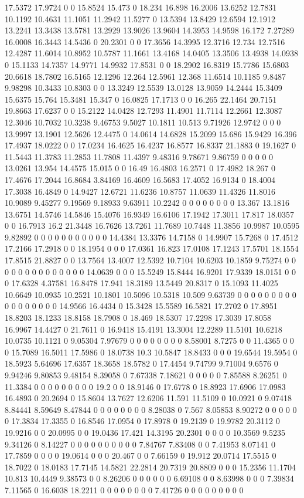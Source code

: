 17.5372 17.9724 0 0 15.8524 15.473 0 18.234 16.898 16.2006 13.6252 12.7831 10.1192 10.4631 11.1051 11.2942 11.5277 0 13.5394 13.8429 12.6594 12.1912 13.2241 13.3438 13.5781 13.2929 13.9026 13.9604 14.3953 14.9598 16.172 7.27289 16.0008 16.3443 14.5436 0 20.2301 0 0 17.3656 14.3995 12.3716 12.734 12.7516 12.4287 11.6014 10.8952 10.5787 11.1661 13.4168 14.0405 13.3506 13.4938 14.0938 0 15.1133 14.7357 14.9771 14.9932 17.8531 0 0 18.2902 16.8319 15.7786 15.6803 20.6618 18.7802 16.5165 12.1296 12.264 12.5961 12.368 11.6514 10.1185 9.8487 9.98298 10.3433 10.8303 0 0 13.3249 12.5539 13.0128 13.9059 14.2444 15.3409 15.6375 15.764 15.3481 15.347 0 16.0825 17.1713 0 0 16.265 22.1464 20.7151 19.8663 17.6237 0 0 15.2122 14.0428 12.7293 11.4901 11.7114 12.2661 12.3087 12.3046 10.7032 10.3238 9.46753 9.5027 10.1811 10.513 9.71926 12.9742 0 0 0 13.9997 13.1901 12.5626 12.4475 0 14.0614 14.6828 15.2099 15.686 15.9429 16.396 17.4937 18.0222 0 0 17.0234 16.4625 16.4237 16.8577 16.8337 21.1883 0 19.1627 0 11.5443 11.3783 11.2853 11.7808 11.4397 9.48316 9.78671 9.86759 0 0 0 0 0 13.0261 13.954 14.4575 15.015 0 0 16.49 16.4803 16.2571 0 17.4982 18.267 0 17.4676 17.2044 16.8684 3.84169 16.4609 16.5683 17.4052 16.9134 0 18.4004 17.3038 16.4849 0 14.9427 12.6721 11.6236 10.8757 11.0639 11.4326 11.8016 10.9089 9.45277 9.19569 9.18933 9.63911 10.2242 0 0 0 0 0 0 0 0 13.367 13.1816 13.6751 14.5746 14.5846 15.4076 16.9349 16.6106 17.1942 17.3011 17.817 18.0357 0 0 16.7913 16.2 21.3448 16.7626 13.7261 11.7689 10.7448 11.3856 10.9987 10.0595 9.82892 0 0 0 0 0 0 0 0 0 0 0 14.4384 13.3376 14.7158 0 14.9907 15.7268 0 17.4512 17.2166 17.2918 0 0 18.1954 0 0 0 17.0361 16.823 17.0108 17.1243 17.5701 18.1554 17.8515 21.8827 0 0 13.7564 13.4007 12.5392 10.7104 10.6203 10.1859 9.75274 0 0 0 0 0 0 0 0 0 0 0 0 0 0 14.0639 0 0 0 15.5249 15.8444 16.9201 17.9339 18.0151 0 0 0 17.6328 4.37581 16.8478 17.941 18.3189 13.5449 20.8317 0 15.1093 11.4025 10.6649 10.0935 10.2521 10.1801 10.5096 10.5318 10.509 9.63739 0 0 0 0 0 0 0 0 0 0 0 0 0 0 0 0 0 14.9566 16.4434 0 15.3428 15.5589 16.5821 17.2702 0 17.8951 18.8203 18.1233 18.8158 18.7908 0 18.469 18.5307 17.2298 17.3039 17.8058 16.9967 14.4427 0 21.7611 0 16.9418 15.4191 13.3004 12.2289 11.5101 10.6218 10.0735 10.1121 0 9.05304 7.97679 0 0 0 0 0 0 0 0 8.58001 8.7275 0 0 11.4365 0 0 0 15.7089 16.5011 17.5986 0 18.0738 10.3 10.5847 18.8433 0 0 0 19.6544 19.5954 0 18.5923 5.64696 17.6357 18.3658 18.5782 0 17.4454 9.74799 9.71004 9.6576 0 9.94246 9.80853 9.48154 8.39058 0 7.67338 7.18621 0 0 0 0 0 7.85588 8.26251 0 11.3384 0 0 0 0 0 0 0 0 0 19.2 0 0 18.9146 0 17.6778 0 18.8923 17.6906 17.0983 16.4893 0 20.2694 0 15.8604 13.7627 12.6206 11.591 11.5109 0 10.0921 0 9.07418 8.84441 8.59649 8.47844 0 0 0 0 0 0 0 0 8.28038 0 7.567 8.05853 8.90272 0 0 0 0 0 0 17.3834 17.3355 0 16.8546 17.0954 0 17.8978 0 19.2139 0 19.9782 20.3112 0 19.9216 0 0 20.0995 0 0 19.0436 17.421 14.3195 20.2301 0 0 0 0 10.3569 9.5235 9.34126 0 8.14227 0 0 0 0 0 0 0 0 0 0 7.84767 7.83408 0 0 7.41953 8.07141 0 17.7859 0 0 0 0 19.0614 0 0 0 20.467 0 0 7.66159 0 19.912 20.0714 17.5515 0 18.7022 0 18.0183 17.7145 14.5821 22.2814 20.7319 20.8809 0 0 0 15.2356 11.1704 10.813 10.4449 9.38573 0 0 8.26206 0 0 0 0 0 0 6.69108 0 0 8.63998 0 0 0 7.39834 7.11565 0 16.6038 18.2211 0 0 0 0 0 0 0 0 7.41726 0 0 0 0 0 0 0 0 0 